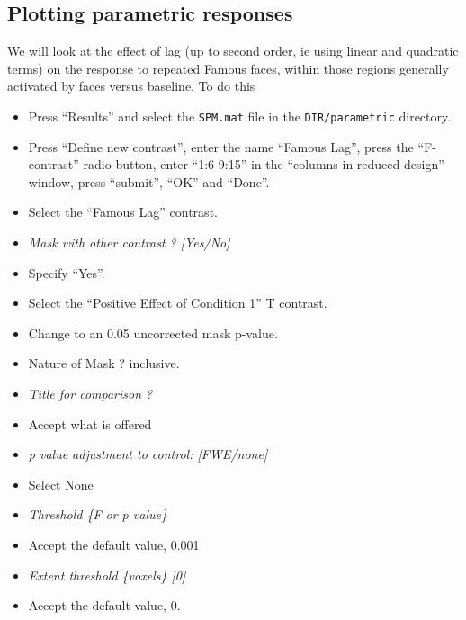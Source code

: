 \subsection{Plotting parametric responses}

We will look at the effect of lag (up to second order, ie using linear and quadratic terms) on the response to repeated Famous faces, within those regions generally activated by faces versus baseline. To do this
\begin{itemize}
\item Press ``Results'' and select the \texttt{SPM.mat} file in the \texttt{DIR/parametric} directory.
\item Press ``Define new contrast'', enter the name ``Famous Lag'', press the ``F-contrast'' radio button, enter ``1:6 9:15'' in the ``columns in reduced design'' window, press ``submit'', ``OK'' and ``Done''.
\item Select the ``Famous Lag'' contrast.
\item \emph{Mask with other contrast ? [Yes/No]}
\item Specify ``Yes''.
\item Select the ``Positive Effect of Condition 1'' T contrast.
\item Change to an 0.05 uncorrected mask p-value.
\item Nature of Mask ? inclusive.
\item \emph{ Title for comparison ?}
\item Accept what is offered
\item \emph{p value adjustment to control: [FWE/none]}
\item Select None
\item \emph{Threshold \{F or p value\}}
\item Accept the default value, 0.001
\item \emph{Extent threshold \{voxels\} [0]}
\item Accept the default value, 0.
\end{itemize}

